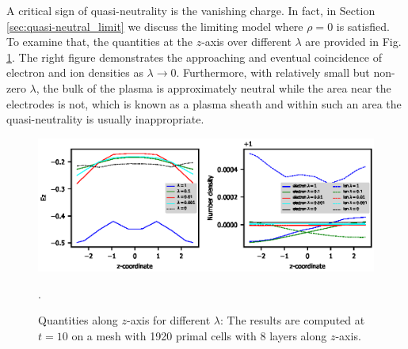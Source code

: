 \documentclass{article}
\begin{document}
A critical sign of quasi-neutrality is the vanishing charge. In fact, in Section \ref{sec:quasi-neutral_limit} we discuss the limiting model where $\rho = 0$ is satisfied. To examine that, the quantities at the $z$-axis over different $\lambda$ are provided in Fig. \ref{fig:zaxis-data_vs_z-T_10}. The right figure demonstrates the approaching and eventual coincidence of electron and ion densities as $\lambda \rightarrow 0$. Furthermore, with relatively small but non-zero $\lambda$, the bulk of the plasma is approximately neutral while the area near the electrodes is not, which is known as a plasma sheath and within such an area the quasi-neutrality is usually inappropriate.
\begin{figure}
    \centering
    \includegraphics{zaxis-data_vs_z-T_10.eps}
    \caption{Quantities along $z$-axis for different $\lambda$: The results are computed at $t = 10$ on a mesh with 1920 primal cells with 8 layers along $z$-axis.}.
    \label{fig:zaxis-data_vs_z-T_10}
\end{figure}
\end{document}
